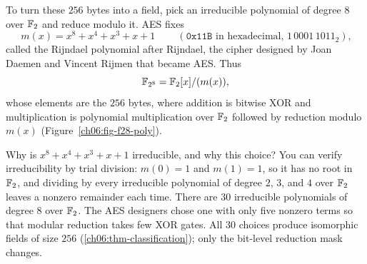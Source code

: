 To turn these $256$ bytes into a field, pick an irreducible polynomial of
degree $8$ over $\mathbb{F}_2$ and reduce modulo it. AES fixes
\[
\boxed{\ m(x) = x^8 + x^4 + x^3 + x + 1\ }
\qquad(\texttt{0x11B} \text{ in hexadecimal, } 1\,0001\,1011_2),
\]
called the Rijndael polynomial after Rijndael, the cipher designed by Joan
Daemen and Vincent Rijmen that became AES. Thus
\[
\mathbb{F}_{2^8} = \mathbb{F}_2[x]/(m(x)),
\]
whose elements are the $256$ bytes, where addition is bitwise XOR and
multiplication is polynomial multiplication over $\mathbb{F}_2$ followed by reduction
modulo $m(x)$ (Figure~\ref{ch06:fig-f28-poly}).

\begin{whybox}
Why is $x^8+x^4+x^3+x+1$ irreducible, and why this choice? You can verify
irreducibility by trial division: $m(0)=1$ and $m(1)=1$, so it has no root in
$\mathbb{F}_2$, and dividing by every irreducible polynomial of degree $2$, $3$, and
$4$ over $\mathbb{F}_2$ leaves a nonzero remainder each time. There are $30$ irreducible
polynomials of degree $8$ over $\mathbb{F}_2$. The AES designers chose one with only
five nonzero terms so that modular reduction takes few XOR gates. All $30$
choices produce isomorphic fields of size $256$
(\autoref{ch06:thm-classification}); only the bit-level reduction mask changes.
\end{whybox}

